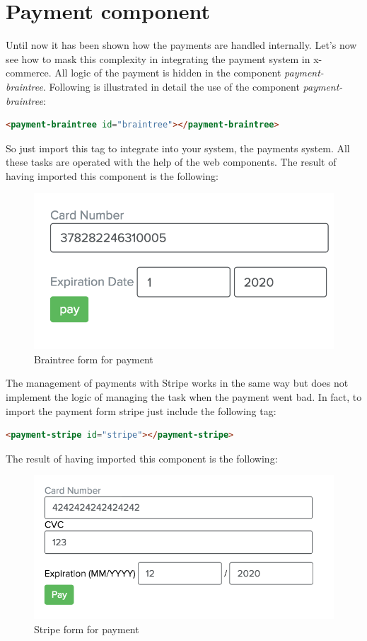 \section{Payment component}
\label{sec:payment_component}
Until now it has been shown how the payments are handled internally. Let's now see how to mask this complexity in integrating the payment system in x-commerce.
\newline
All logic of the payment is hidden in the component \emph{payment-braintree}.
\newline
Following is illustrated in detail the use of the component \emph{payment-braintree}:
\begin{lstlisting}[language=html]
<payment-braintree id="braintree"></payment-braintree>
\end{lstlisting}
So just import this tag to integrate into your system, the payments system. All these tasks are operated with the help of the web components.
\newline
The result of having imported this component is the following:
\begin{figure}[htb]
 \centering
 \includegraphics[width=0.8\linewidth]{images/chapter5/braintree1.png}\hfill
 \caption[Braintree form]{Braintree form for payment}
 \label{fig:brintree_form1}
\end{figure}
The management of payments with Stripe works in the same way but does not implement the logic of managing the task when the payment went bad. In fact, to import the payment form stripe just include the following tag:
\begin{lstlisting}[language=html]
<payment-stripe id="stripe"></payment-stripe>
\end{lstlisting}
The result of having imported this component is the following:
\begin{figure}[htb]
 \centering
 \includegraphics[width=0.8\linewidth]{images/chapter5/stripe1.png}\hfill
 \caption[Stripe form]{Stripe form for payment}
 \label{fig:brintree_form1}
\end{figure}